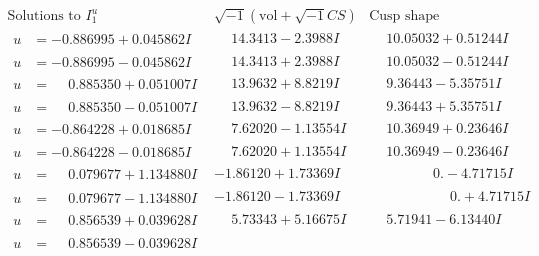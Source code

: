 \documentclass[1p]{elsarticle_modified}
\theoremstyle{definition}
\newcommand{\I}{\sqrt{-1}}
\begin{document}
$$\begin{array}{c|c|c}  
\text{Solutions to }I^u_{1}& \I (\text{vol} + \sqrt{-1}CS) & \text{Cusp shape}\\
 \hline 
\begin{aligned}
u &= -0.886995 + 0.045862 I\end{aligned}
 & \phantom{-}14.3413 - 2.3988 I & \phantom{-}10.05032 + 0.51244 I \\ \hline\begin{aligned}
u &= -0.886995 - 0.045862 I\end{aligned}
 & \phantom{-}14.3413 + 2.3988 I & \phantom{-}10.05032 - 0.51244 I \\ \hline\begin{aligned}
u &= \phantom{-}0.885350 + 0.051007 I\end{aligned}
 & \phantom{-}13.9632 + 8.8219 I & \phantom{-}9.36443 - 5.35751 I \\ \hline\begin{aligned}
u &= \phantom{-}0.885350 - 0.051007 I\end{aligned}
 & \phantom{-}13.9632 - 8.8219 I & \phantom{-}9.36443 + 5.35751 I \\ \hline\begin{aligned}
u &= -0.864228 + 0.018685 I\end{aligned}
 & \phantom{-}7.62020 - 1.13554 I & \phantom{-}10.36949 + 0.23646 I \\ \hline\begin{aligned}
u &= -0.864228 - 0.018685 I\end{aligned}
 & \phantom{-}7.62020 + 1.13554 I & \phantom{-}10.36949 - 0.23646 I \\ \hline\begin{aligned}
u &= \phantom{-}0.079677 + 1.134880 I\end{aligned}
 & -1.86120 + 1.73369 I & \phantom{-0.000000 } 0. - 4.71715 I \\ \hline\begin{aligned}
u &= \phantom{-}0.079677 - 1.134880 I\end{aligned}
 & -1.86120 - 1.73369 I & \phantom{-0.000000 -}0. + 4.71715 I \\ \hline\begin{aligned}
u &= \phantom{-}0.856539 + 0.039628 I\end{aligned}
 & \phantom{-}5.73343 + 5.16675 I & \phantom{-}5.71941 - 6.13440 I \\ \hline\begin{aligned}
u &= \phantom{-}0.856539 - 0.039628 I\end{aligned}

\end{array}$$
\end{document}
